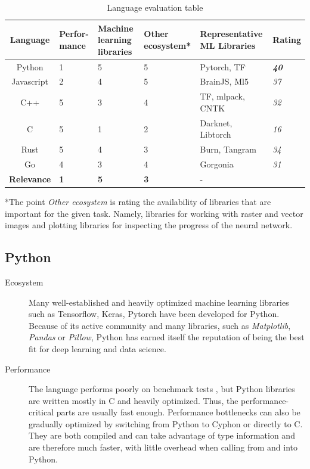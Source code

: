 \documentclass[12pt, a4paper, titlepage]{report}
\begin{document}
\begin{table}[h]
   \begin{tabular} {|c||p{2.0cm}|p{2.5cm}|p{2.5cm}|p{3.0cm}||p{1.5cm}|}
      \hline
      \textbf{Language}    & \textbf{Perfor-mance} & \textbf{Machine learning libraries} & \textbf{Other ecosystem*} & \textbf{Representative ML Libraries} & \textbf{Rating} \\
      \hline
      Python      & 1 & 5 & 5 & Pytorch, TF        & \textbf{\emph{40}} \\ \hline
      Javascript  & 2 & 4 & 5 & BrainJS, Ml5       & \emph{37} \\ \hline
      C++         & 5 & 3 & 4 & TF, mlpack, CNTK   & \emph{32} \\ \hline
      C           & 5 & 1 & 2 & Darknet, Libtorch  & \emph{16} \\ \hline
      Rust        & 5 & 4 & 3 & Burn, Tangram      & \emph{34} \\ \hline
      Go          & 4 & 3 & 4 & Gorgonia           & \emph{31} \\
      \hline\hline
      \textbf{Relevance} & \textbf{1} & \textbf{5} & \textbf{3} & - & \\
      \hline
   \end{tabular}
   \caption{Language evaluation table\\}
   *The point \emph{Other ecosystem} is rating the availability of libraries that are important for the given task. Namely, libraries for working with raster and vector images and plotting libraries for inspecting the progress of the neural network.

   \label{table:language_evaluation}
\end{table}

\vspace{0.5cm}
{
   \center
   \subsection*{Python}
}
\begin{description}
   \item[Ecosystem] Many well-established and heavily optimized machine learning libraries such as Tensorflow, Keras, Pytorch have been developed for Python. Because of its active community and many libraries, such as \emph{Matplotlib}, \emph{Pandas} or \emph{Pillow}, Python has earned itself the reputation of being the best fit for deep learning and data science.
   \item[Performance] The language performs poorly on benchmark tests \cite{goodmanwen_programming-language-benchmarks-visualization_2023}, but Python libraries are written mostly in C and heavily optimized. Thus, the performance-critical parts are usually fast enough. Performance bottlenecks can also be gradually optimized by switching from Python to Cyphon or directly to C. They are both compiled and can take advantage of type information and are therefore much faster, with little overhead when calling from and into Python.
\end{description}
\end{document}
